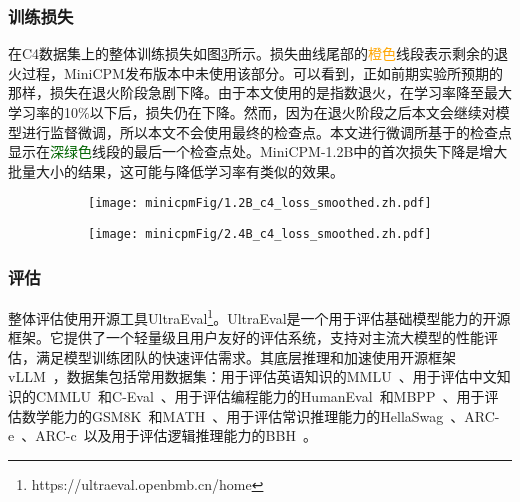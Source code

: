 \subsubsection{训练损失}


在C4数据集上的整体训练损失如图\ref{fig:loss_c4}所示。损失曲线尾部的\textcolor{orange}{橙色}线段表示剩余的退火过程，MiniCPM发布版本中未使用该部分。可以看到，正如前期实验所预期的那样，损失在退火阶段急剧下降。由于本文使用的是指数退火，在学习率降至最大学习率的10\%以下后，损失仍在下降。然而，因为在退火阶段之后本文会继续对模型进行监督微调，所以本文不会使用最终的检查点。本文进行微调所基于的检查点显示在\textcolor{darkgreen}{深绿色}线段的最后一个检查点处。MiniCPM-1.2B中的首次损失下降是增大批量大小的结果，这可能与降低学习率有类似的效果\cite{smith2017don}。


\begin{figure}[htbp]
    \centering
    \caption{1.2B（上）和 2.4B（下）MiniCPM 在 C4 数据集上的损失曲线}
    \begin{subfigure}{0.48\linewidth}
        \centering
        \texttt{[image: minicpmFig/1.2B\_c4\_loss\_smoothed.zh.pdf]}
        \label{fig:loss_c4_1.2B}
    \end{subfigure}
    \begin{subfigure}{0.48\linewidth}
        \centering
        \texttt{[image: minicpmFig/2.4B\_c4\_loss\_smoothed.zh.pdf]}
        \label{fig:loss_c4_2.4B}
    \end{subfigure}
    \label{fig:loss_c4}
\end{figure}

\subsubsection{评估}
\label{sec:evaluation}
整体评估使用开源工具UltraEval\footnote{https://ultraeval.openbmb.cn/home}。UltraEval是一个用于评估基础模型能力的开源框架。它提供了一个轻量级且用户友好的评估系统，支持对主流大模型的性能评估，满足模型训练团队的快速评估需求。其底层推理和加速使用开源框架vLLM~\citep{kwon2023efficient}，数据集包括常用数据集：用于评估英语知识的MMLU~\citep{hendrycks2020measuring}、用于评估中文知识的CMMLU~\citep{li2024cmmlu}和C-Eval~\citep{huang2024c}、用于评估编程能力的HumanEval~\citep{chen2021evaluating}和MBPP~\citep{austin2021program}、用于评估数学能力的GSM8K~\citep{cobbe2021training}和MATH~\citep{hendrycks2021measuring}、用于评估常识推理能力的HellaSwag~\citep{zellers2019hellaswag}、ARC-e~\citep{clark2018think}、ARC-c~\citep{clark2018think}以及用于评估逻辑推理能力的BBH~\citep{suzgun2022challenging}。

